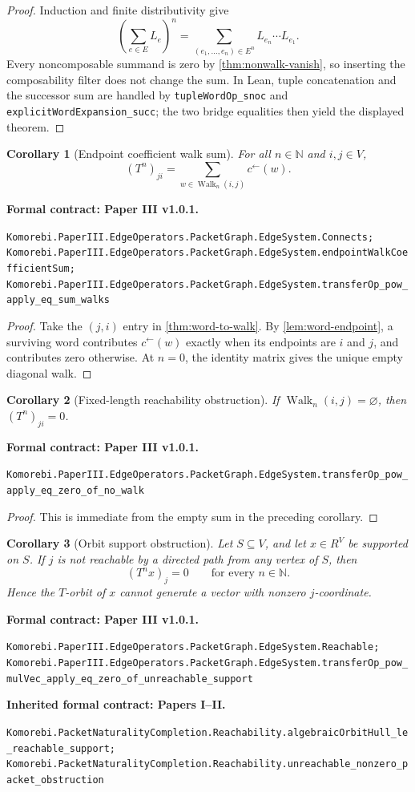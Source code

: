 \documentclass[11pt,a4paper]{article}
\theoremstyle{plain}
\newtheorem{corollary}[corollary]{Corollary}
\theoremstyle{definition}
\theoremstyle{remark}
\newcommand{\N}{\mathbb N}
\newcommand{\Walk}{\operatorname{Walk}}
\newcommand{\leanname}[1]{\nolinkurl{#1}}
\newcommand{\statusleanthree}[1]{\par\smallskip\noindent\begin{minipage}{\linewidth}{\color{leanblue}\textbf{Formal contract: Paper III v1.0.1.}}\par\begingroup\small\raggedright\leanname{#1}\par\endgroup\end{minipage}\par\smallskip}
\newcommand{\statusleanprior}[1]{\par\smallskip\noindent\begin{minipage}{\linewidth}{\color{leanblue}\textbf{Inherited formal contract: Papers I--II.}}\par\begingroup\small\raggedright\leanname{#1}\par\endgroup\end{minipage}\par\smallskip}
\begin{document}
\begin{proof}
Induction and finite distributivity give
\[
\left(\sum_{e\in E}L_e\right)^n
=
\sum_{(e_1,\ldots,e_n)\in E^n}L_{e_n}\cdots L_{e_1}.
\]
Every noncomposable summand is zero by
\cref{thm:nonwalk-vanish}, so inserting the composability filter does not
change the sum.  In Lean, tuple concatenation and the successor sum are
handled by \leanname{tupleWordOp_snoc} and
\leanname{explicitWordExpansion_succ}; the two bridge equalities then yield
the displayed theorem.
\end{proof}

\begin{corollary}[Endpoint coefficient walk sum]
\label{cor:word-to-walk-entry}
For all $n\in\N$ and $i,j\in V$,
\[
  \boxed{
  (T^n)_{ji}
  =
  \sum_{w\in\Walk_n(i,j)}c^\leftarrow(w).
  }
\]
\end{corollary}
\statusleanthree{Komorebi.PaperIII.EdgeOperators.PacketGraph.EdgeSystem.Connects; Komorebi.PaperIII.EdgeOperators.PacketGraph.EdgeSystem.endpointWalkCoefficientSum; Komorebi.PaperIII.EdgeOperators.PacketGraph.EdgeSystem.transferOp_pow_apply_eq_sum_walks}

\begin{proof}
Take the $(j,i)$ entry in \cref{thm:word-to-walk}.  By
\cref{lem:word-endpoint}, a surviving word contributes
$c^\leftarrow(w)$ exactly when its endpoints are $i$ and $j$, and contributes
zero otherwise.  At $n=0$, the identity matrix gives the unique empty
diagonal walk.
\end{proof}

\begin{corollary}[Fixed-length reachability obstruction]
\label{cor:fixed-reachability}
If $\Walk_n(i,j)=\varnothing$, then $(T^n)_{ji}=0$.
\end{corollary}
\statusleanthree{Komorebi.PaperIII.EdgeOperators.PacketGraph.EdgeSystem.transferOp_pow_apply_eq_zero_of_no_walk}

\begin{proof}
This is immediate from the empty sum in the preceding corollary.
\end{proof}

\begin{corollary}[Orbit support obstruction]
\label{cor:orbit-reachability}
Let $S\subseteq V$, and let $x\in R^V$ be supported on $S$.  If $j$ is not
reachable by a directed path from any vertex of $S$, then
\[
  (T^nx)_j=0\qquad\text{for every }n\in\N.
\]
Hence the $T$-orbit of $x$ cannot generate a vector with nonzero
$j$-coordinate.
\end{corollary}
\statusleanthree{Komorebi.PaperIII.EdgeOperators.PacketGraph.EdgeSystem.Reachable; Komorebi.PaperIII.EdgeOperators.PacketGraph.EdgeSystem.transferOp_pow_mulVec_apply_eq_zero_of_unreachable_support}
\statusleanprior{Komorebi.PacketNaturalityCompletion.Reachability.algebraicOrbitHull_le_reachable_support; Komorebi.PacketNaturalityCompletion.Reachability.unreachable_nonzero_packet_obstruction}
\end{document}
